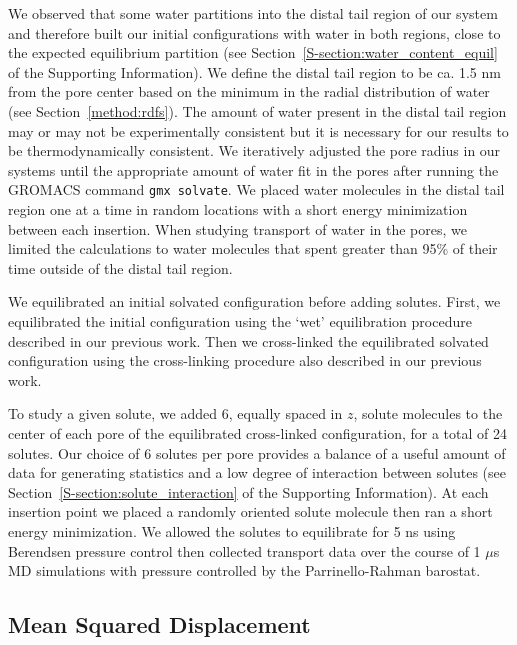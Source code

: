 \documentclass[journal=jpcbfk,manuscript=article]{achemso}
\begin{document}
  We observed that some water partitions into the distal tail region of our system and therefore
  built our initial configurations with water in both regions, close to the expected
  equilibrium partition (see Section~\ref{S-section:water_content_equil} of the Supporting
  Information). We define the distal tail region to be ca. 1.5 nm from the pore
  center based on the minimum in the radial distribution of water
  (see Section~\ref{method:rdfs}). The amount of water present in the distal tail region
  may or may not be experimentally consistent but it is necessary for our results to be 
  thermodynamically consistent. We iteratively adjusted the pore radius in our systems
  until the appropriate amount of water fit in the pores after running the GROMACS command
  \texttt{gmx solvate}. We placed water molecules in the distal tail region one at a time
  in random locations with a short energy minimization between each insertion. When 
  studying transport of water in the pores, we limited the calculations to water molecules
  that spent greater than 95\% of their time outside of the distal tail region.

  We equilibrated an initial solvated configuration before adding solutes. First, we 
  equilibrated the initial configuration using the `wet' equilibration procedure 
  described in our previous work. Then we cross-linked the equilibrated solvated 
  configuration using the cross-linking procedure also described in our previous 
  work.~\cite{coscia_understanding_2019}

  To study a given solute, we added 6, equally spaced in $z$, solute molecules to the
  center of each pore of the equilibrated cross-linked configuration, for a total of 24
  solutes. Our choice of 6 solutes per pore provides a balance of a useful amount of 
  data for generating statistics and a low degree of interaction between solutes (see 
  Section~\ref{S-section:solute_interaction} of the Supporting Information). At each
  insertion point we placed a randomly oriented solute molecule then ran a short 
  energy minimization. We allowed the solutes to equilibrate for 5 ns using Berendsen
  pressure control then collected transport data over the course of 1 $\mu$s MD simulations
  with pressure controlled by the Parrinello-Rahman barostat.
  
  \subsection{Mean Squared Displacement}\label{method:MSD}
\end{document}
